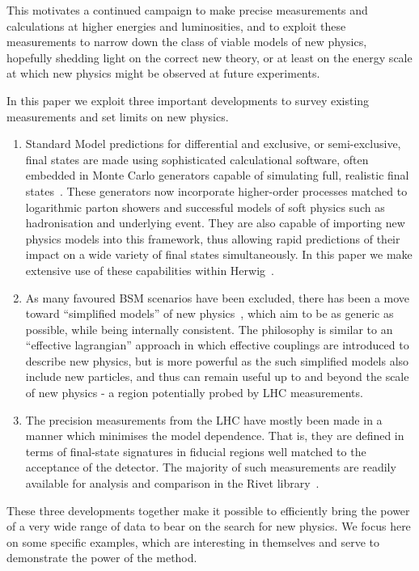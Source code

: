 \documentclass[floatfix]{article}
\begin{document}
This motivates a continued campaign to make precise measurements and calculations at higher energies and 
luminosities, and to exploit these measurements to narrow down the class of viable models of new physics, 
hopefully shedding light on the correct new theory, or at least on the energy scale at which
new physics might be observed at future experiments.

In this paper we exploit three important developments to survey existing measurements and set 
limits on new physics. 

\begin{enumerate}
\item
Standard Model predictions for differential and exclusive, or semi-exclusive, 
final states are made using sophisticated calculational software, often embedded in Monte Carlo generators 
capable of simulating full, realistic final states~\cite{Buckley:2011ms}.
These generators now incorporate higher-order processes
matched to logarithmic parton showers and successful models of soft physics such as hadronisation and
underlying event. They are also capable of importing new physics models into this framework, thus allowing
rapid predictions of their impact on a wide variety of final states simultaneously. 
In this paper we make extensive use of these capabilities within Herwig~\cite{Bahr:2008pv}.
\item
As many favoured BSM scenarios have been excluded, there has been a move toward 
``simplified models'' of new physics~\cite{Alves:2011wf,Abercrombie:2015wmb}, which aim to be as generic as possible, while being
internally consistent. The philosophy is similar to an ``effective lagrangian'' approach in which effective
couplings are introduced to describe new physics, but is more powerful as the such simplified models also
include new particles, and thus can remain useful up to and beyond the scale of new physics - a region 
potentially probed by LHC measurements.
\item
The precision measurements from the LHC have mostly been made in a manner which minimises the model 
dependence. That is, they are defined in terms of final-state signatures in fiducial regions well matched to the
acceptance of the detector. The majority of such measurements are readily available for analysis and
comparison in the Rivet library~\cite{Buckley:2010ar}. 
\end{enumerate}

These three developments together make it possible to efficiently 
bring the power of a very wide range of data to bear on the search for new physics. We focus here on 
some specific examples, which are interesting in themselves and serve to demonstrate the power of the method.
\end{document}
